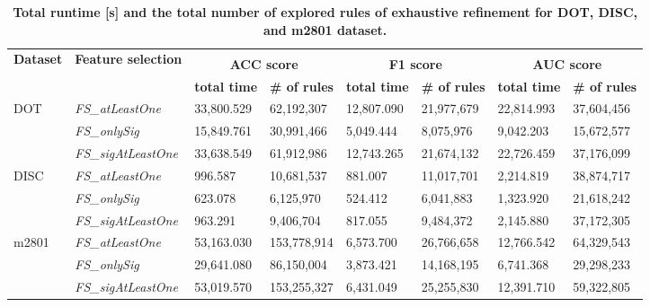 \documentclass{bmcart}
\begin{document}
\begin{backmatter}
\begin{table}[h!]
\centering
\caption{
{\bf Total runtime [s] and the total number of explored rules of exhaustive refinement for DOT, DISC, and m2801 dataset.}}\label{tab:runtimes_short_exhaustive}
\begin{tabular}{|l|l|l|l|l|l|l|l|}
\hline
  \multirow{3}{*}{{\bf Dataset}} & \multirow{3}{*}{{\bf Feature selection}} & \multicolumn{6}{c|}{} \\
  & & \multicolumn{2}{c|}{{\bf ACC score}} & \multicolumn{2}{c|}{{\bf F1 score}} & \multicolumn{2}{c|}{{\bf AUC score}}\\
   & & {\bf total time} & {\bf \# of rules} & {\bf total time} & {\bf \# of rules} & {\bf total time} & {\bf \# of rules} \\ \hline
\multirow{3}{*}{DOT} & \emph{FS\_atLeastOne} & 33,800.529 & 62,192,307 & 12,807.090 & 21,977,679 & 22,814.993 & 37,604,456 \\ \cline{2-8}
 &  \emph{FS\_onlySig}&  15,849.761 & 30,991,466 & 5,049.444 & 8,075,976 & 9,042.203 & 15,672,577 \\ \cline{2-8}
 & \emph{FS\_sigAtLeastOne} & 33,638.549 & 61,912,986 & 12,743.265 & 21,674,132 & 22,726.459 & 37,176,099 \\ \hline
\multirow{3}{*}{DISC} & \emph{FS\_atLeastOne} & 996.587 & 10,681,537 & 881.007 & 11,017,701 & 2,214.819 & 38,874,717 \\ \cline{2-8}
 & \emph{FS\_onlySig} & 623.078 & 6,125,970 & 524.412 & 6,041,883 & 1,323.920 & 21,618,242 \\ \cline{2-8}
 & \emph{FS\_sigAtLeastOne} & 963.291 & 9,406,704 & 817.055 & 9,484,372 & 2,145.880 & 37,172,305 \\ \hline
\multirow{3}{*}{m2801} & \emph{FS\_atLeastOne} & 53,163.030 & 153,778,914 & 6,573.700 & 26,766,658 & 12,766.542 & 64,329,543 \\ \cline{2-8}
 & \emph{FS\_onlySig} & 29,641.080 & 86,150,004 & 3,873.421 & 14,168,195 & 6,741.368 & 29,298,233 \\ \cline{2-8}
 & \emph{FS\_sigAtLeastOne} & 53,019.570 & 153,255,327 & 6,431.049 & 25,255,830 & 12,391.710 & 59,322,805 \\ \hline
\end{tabular}
\end{table}


\end{backmatter}
\end{document}
